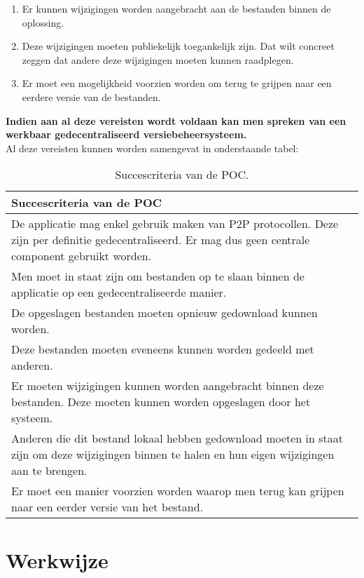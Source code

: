 \begin{enumerate}
\item Er kunnen wijzigingen worden aangebracht aan de bestanden binnen de oplossing.
\item Deze wijzigingen moeten publiekelijk toegankelijk zijn. Dat wilt concreet zeggen dat andere deze wijzigingen moeten kunnen raadplegen.
\item Er moet een mogelijkheid voorzien worden om terug te grijpen naar een eerdere versie van de bestanden. 
\end{enumerate}

\textbf{Indien aan al deze vereisten wordt voldaan kan men spreken van een werkbaar gedecentraliseerd versiebeheersysteem.}\\

Al deze vereisten kunnen worden samengevat in onderstaande tabel:
\begin{table}[h!]
	\centering
	\begin{tabular}{ |p{14cm}|}
 		\hline
 		\large \textbf{Succescriteria van de POC} \\
 		\hline
 		De applicatie mag enkel gebruik maken van P2P protocollen. Deze zijn per definitie gedecentraliseerd. Er mag dus geen centrale component gebruikt worden.\\
 		\hline 
 		Men moet in staat zijn om bestanden op te slaan binnen de applicatie op een gedecentraliseerde manier.\\
 		\hline
 		De opgeslagen bestanden moeten opnieuw gedownload kunnen worden.\\
 		\hline
		Deze bestanden moeten eveneens kunnen worden gedeeld met anderen.\\
 		\hline
 		Er moeten wijzigingen kunnen worden aangebracht binnen deze bestanden. Deze moeten kunnen worden opgeslagen door het systeem.\\
 		\hline
 		Anderen die dit bestand lokaal hebben gedownload moeten in staat zijn om deze wijzigingen binnen te halen en hun eigen wijzigingen aan te brengen.\\
 		\hline
 		Er moet een manier voorzien worden waarop men terug kan grijpen naar een eerder versie van het bestand.\\
 		\hline
 	\end{tabular}
	\label{suc_crit}
	\caption{Succescriteria van de POC.}
\end{table}
\newpage
\section{Werkwijze}
